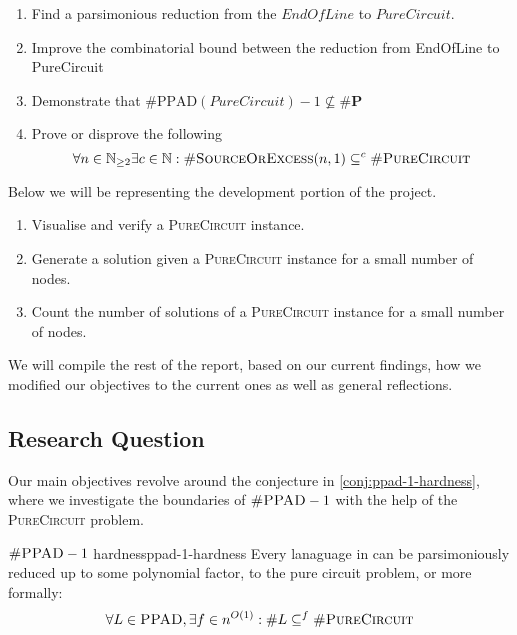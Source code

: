 \begin{enumerate}[label*=R.\arabic*)]
    \item Find a parsimonious reduction from the $\textit{EndOfLine}$ to $\textit{PureCircuit}$.
    \item Improve the combinatorial bound between the reduction from EndOfLine to PureCircuit
    \item Demonstrate that $\textbf{\#}\text{PPAD}(PureCircuit)- 1 \not\subseteq \textbf{\#P}$
    \item Prove or disprove the following
\[
\forall n \in \mathbb{N}_{\geq 2} \exists c \in \mathbb{N}:  \textnormal{\textsc{\#SourceOrExcess}}(n, 1) \subseteq^c \textnormal{\textsc{\#PureCircuit}}
\]

\end{enumerate}

Below we will be representing the development portion of the project.

\begin{enumerate}[label=S.\arabic*)]
    \item Visualise and verify a \textsc{PureCircuit} instance.
    \item Generate a solution given a \textsc{PureCircuit} instance for a small number of nodes.
    \item Count the number of solutions of a  \textsc{PureCircuit} instance for a small number of nodes.
\end{enumerate}


We will compile the rest of the report, based on our current findings, how we modified our objectives to
the current ones as well as general reflections.


\subsection{Research Question}

Our main objectives revolve around the conjecture in \ref{conj:ppad-1-hardness}, where
we investigate the boundaries of $\textnormal{\textsc{\#PPAD}}-1$ with the help of the \textsc{PureCircuit} problem.
\begin{conjecturebox}{$\textnormal{\textsc{\#PPAD}}-1$ hardness}{ppad-1-hardness}
    Every lanaguage in  can be parsimoniously reduced up to some polynomial factor, to the
    pure circuit problem,  or more formally:
    $$
    \forall L \in \textnormal{\textsc{PPAD}}, \exists f \in n^{O(1)}: 
    \#L \subseteq^f \textnormal{\textsc{\#PureCircuit}}
    $$
\end{conjecturebox}

